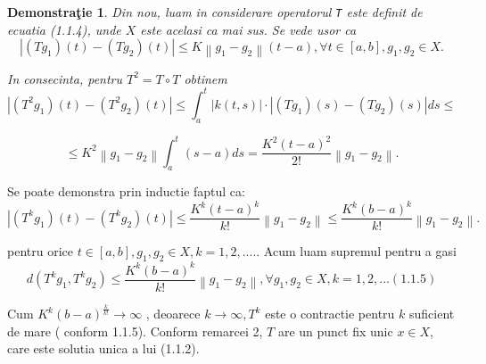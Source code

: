 \documentclass[a4paper,12pt,oneside]{report}
\newtheorem{demonstration}{Demonstra\c tie}
\begin{document}
\begin{demonstration}
					
					
	Din nou, luam in considerare operatorul \texttt{T} este definit de ecuatia (1.1.4), unde \(X\) este acelasi ca mai sus. Se vede usor ca
	\begin{displaymath}
		\left | \left ( Tg_{1} \right )\left ( t \right )  - \left ( Tg_{2} \right )\left ( t \right )\right |\leq K\left \| g_{1}  - g_{2}\right \|\left ( t-a \right ), \forall t\in \left [ a,b \right ], g_{1}, g_{2} \in X. 
	\end{displaymath}
					
	In consecinta, pentru \(T^{2} = T \circ T\) obtinem 
	\begin{displaymath}
		\left | \left ( T^{2}g_{1} \right )\left ( t \right )  - \left ( T^{2}g_{2} \right )\left ( t \right )\right |\leq \int_{a}^{t}\left | k\left ( t,s \right ) \right |\cdot \left | \left ( Tg_{1} \right )\left ( s \right ) - \left ( Tg_{2} \right )\left ( s \right ) \right |ds\leq
	\end{displaymath}
					
	\begin{displaymath}
		\leq K^{2}\left \| g_{1} - g_{2} \right \|\int_{a}^{t}\left ( s-a \right )ds = \frac{K^{2}\left ( t-a \right )^{2}}{2!}\left \| g_{1} - g_{2} \right \|. 
	\end{displaymath}
					
\end{demonstration}


Se poate demonstra prin inductie faptul ca:
\begin{displaymath}
	\left | \left ( T^{k}g_{1} \right ) \left ( t \right ) - \left ( T^{k}g_{2} \right )\left ( t \right )\right |\leq \frac{K^{k}\left ( t-a \right )^{k}}{k!}\left \| g_{1} - g_{2} \right \|\leq \frac{K^{k}\left ( b-a \right )^{k}}{k!}\left \| g_{1}- g_{2} \right \|. 
\end{displaymath}

pentru orice  \(t\in \left [ a,b \right ], g_{1}, g_{2} \in X, k = 1,2,.....\) Acum luam supremul pentru a gasi
\begin{displaymath}
	d\left ( T^{k}g_{1} , T^{k}g_{2}\right ) \leq \frac{K^{k}\left ( b - a  \right )^{k}}{k!}\left \| g_{1} - g_{2}\right \|, \forall g_{1}, g_{2} \in X, k = 1,2,... ( 1.1.5)
\end{displaymath}

Cum \(K^{k} \left ( b-a \right )^{\frac{k}{k!}}\rightarrow \infty\) , deoarece \(k\rightarrow \infty, T^{k}\) este o contractie pentru \(k\) suficient de mare ( conform 1.1.5). Conform remarcei 2, \(T\) are un punct fix unic \(x \in X\), care este solutia unica a lui (1.1.2). 
\end{document}
